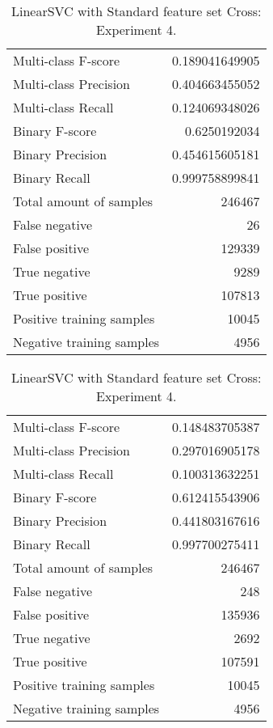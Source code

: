 \begin{table}[H]
\begin{minipage}{0.5\textwidth}
\caption{LinearSVC with Standard feature set Cross: Experiment 3.}
\centering
\begin{tabular}{l r}
\toprule
Multi-class F-score & 0.189041649905 \\
Multi-class Precision & 0.404663455052 \\
Multi-class Recall & 0.124069348026 \\
\midrule
Binary F-score & 0.6250192034 \\
Binary Precision & 0.454615605181 \\
Binary Recall & 0.999758899841 \\
\midrule
Total amount of samples & 246467 \\
False negative & 26 \\
False positive & 129339 \\
True negative & 9289 \\
True positive & 107813 \\
\midrule
Positive training samples & 10045 \\
Negative training samples & 4956 \\
\bottomrule
\end{tabular}
\end{minipage}
\hfillx
\begin{minipage}{0.5\textwidth}
\caption{LinearSVC with Standard feature set Cross: Experiment 4.}
\centering
\begin{tabular}{l r}
\toprule
Multi-class F-score & 0.148483705387 \\
Multi-class Precision & 0.297016905178 \\
Multi-class Recall & 0.100313632251 \\
\midrule
Binary F-score & 0.612415543906 \\
Binary Precision & 0.441803167616 \\
Binary Recall & 0.997700275411 \\
\midrule
Total amount of samples & 246467 \\
False negative & 248 \\
False positive & 135936 \\
True negative & 2692 \\
True positive & 107591 \\
\midrule
Positive training samples & 10045 \\
Negative training samples & 4956 \\
\bottomrule
\end{tabular}
\end{minipage}
\end{table}
